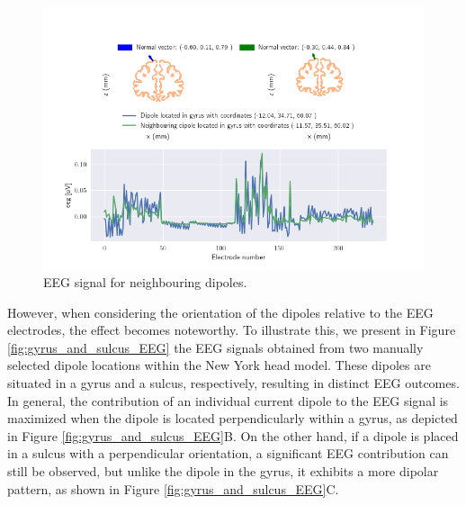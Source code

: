 \documentclass[a4paper, UKenglish, 11pt]{uiomaster}
\begin{document}
\begin{figure}[!htb]
    \centering
    \includegraphics[width=\linewidth]{figures/neighbour_dipoles.png}
    \caption{EEG signal for neighbouring dipoles.}
    \label{fig:neighbour_dipoles}
\end{figure}

However, when considering the orientation of the dipoles relative to the EEG electrodes, the effect becomes noteworthy. To illustrate this, we present in Figure \ref{fig:gyrus_and_sulcus_EEG} the EEG signals obtained from two manually selected dipole locations within the New York head model. These dipoles are situated in a gyrus and a sulcus, respectively, resulting in distinct EEG outcomes. In general, the contribution of an individual current dipole to the EEG signal is maximized when the dipole is located perpendicularly within a gyrus, as depicted in Figure \ref{fig:gyrus_and_sulcus_EEG}B. On the other hand, if a dipole is placed in a sulcus with a perpendicular orientation, a significant EEG contribution can still be observed, but unlike the dipole in the gyrus, it exhibits a more dipolar pattern, as shown in Figure \ref{fig:gyrus_and_sulcus_EEG}C.
\end{document}
